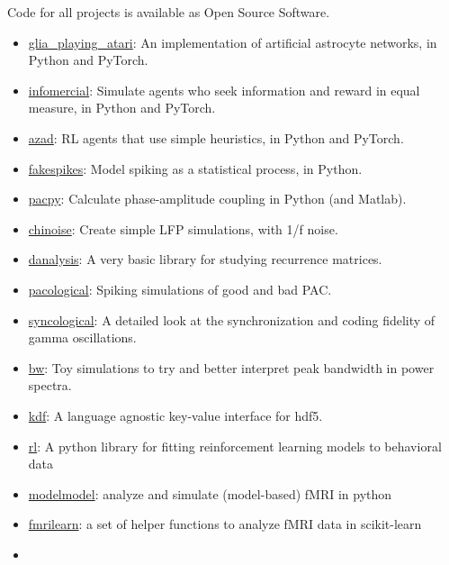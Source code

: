 Code for all projects is available as Open Source Software.

\begin{itemize}
\item
  \href{https://github.com/CoAxLab/glia_playing_atari}{glia\_playing\_atari}:
  An implementation of artificial astrocyte networks, in Python and
  PyTorch.
\item
  \href{https://github.com/CoAxLab/infomercial}{infomercial}: Simulate
  agents who seek information and reward in equal measure, in Python and
  PyTorch.
\item
  \href{https://github.com/CoAxLab/azad}{azad}: RL agents that use
  simple heuristics, in Python and PyTorch.
\item
  \href{https://github.com/voytekresearch/fakespikes}{fakespikes}: Model
  spiking as a statistical process, in Python.
\item
  \href{https://github.com/voytekresearch/pacpy}{pacpy}: Calculate
  phase-amplitude coupling in Python (and Matlab).
\item
  \href{https://github.com/voytekresearch/chinoise}{chinoise}: Create
  simple LFP simulations, with 1/f noise.
\item
  \href{https://github.com/voytekresearch/danalysis}{danalysis}: A very
  basic library for studying recurrence matrices.
\item
  \href{https://github.com/voytekresearch/pacological}{pacological}:
  Spiking simulations of good and bad PAC.
\item
  \href{https://github.com/voytekresearch/syncological}{syncological}: A
  detailed look at the synchronization and coding fidelity of gamma
  oscillations.
\item
  \href{https://github.com/voytekresearch/bw}{bw}: Toy simulations to
  try and better interpret peak bandwidth in power spectra.
\item
  \href{https://github.com/parenthetical-e/kdf}{kdf}: A language
  agnostic key-value interface for hdf5.
\item
  \href{https://github.com/parenthetical-e/rl}{rl}: A python library for
  fitting reinforcement learning models to behavioral data
\item
  \href{http://parenthetical-e.github.io/modelmodel/}{modelmodel}:
  analyze and simulate (model-based) fMRI in python
\item
  \href{https://github.com/parenthetical-e/fmrilearn}{fmrilearn}: a set
  of helper functions to analyze fMRI data in scikit-learn
\item

\end{itemize}
